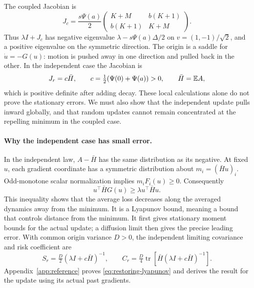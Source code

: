 The coupled Jacobian is
\[
 J_c=\frac{s\Psi(a)}2
 \begin{pmatrix}K+M&b(K+1)\\b(K+1)&K+M\end{pmatrix}.
\]
Thus $\lambda I+J_c$ has negative eigenvalue
$\lambda-s\Psi(a)\Delta/2$ on $v=(1,-1)/\sqrt2$, and a positive
eigenvalue on the symmetric direction. The origin is a saddle for
$\dot u=-G(u)$: motion is pushed away in one direction and pulled back in
the other. In the independent case the Jacobian is
\[
 J_r=c\bar H,\qquad c=\tfrac12(\Psi(0)+\Psi(a))>0,
 \qquad \bar H=\mathbb E A,
\]
which is positive definite after adding decay. These local calculations
alone do not prove the stationary errors. We must also show that the
independent update pulls inward globally, and that random updates cannot
remain concentrated at the repelling minimum in the coupled case.

\paragraph{Why the independent case has small error.}
In the independent law, $A-\bar H$ has the same distribution as its negative.
At fixed $u$, each gradient coordinate has a symmetric distribution about
$m_i=(\bar H u)_i$. Odd-monotone scalar normalization implies
$m_iF_i(u)\geq0$. Consequently
\begin{equation}\label{eq:restoring-lyapunov}
 u^\top\bar H G(u)\geq\lambda u^\top\bar H u.
\end{equation}
This inequality shows that the average loss decreases along the averaged
dynamics away from the minimum. It is a Lyapunov bound, meaning a bound
that controls distance from the minimum. It first gives stationary moment
bounds for the actual update; a diffusion limit then gives the precise
leading error. With common origin variance $D>0$,
the independent limiting covariance and risk coefficient are
\begin{equation}\label{eq:reference-limit}
 S_r=\tfrac D2(\lambda I+c\bar H)^{-1},\qquad
 C_r=\tfrac D4\operatorname{tr}[\bar H(\lambda I+c\bar H)^{-1}].
\end{equation}
Appendix~\ref{app:reference} proves \eqref{eq:restoring-lyapunov} and
derives the result for the update using its actual past gradients.

